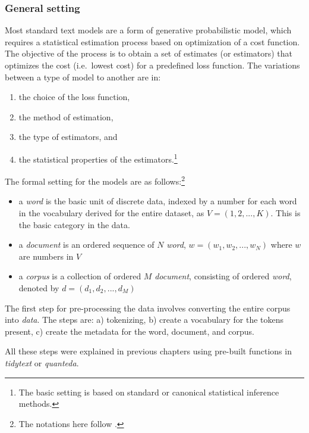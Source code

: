 \documentclass[
]{article}
\providecommand{\tightlist}{%
  \setlength{\itemsep}{0pt}\setlength{\parskip}{0pt}}
\begin{document}
\hypertarget{general-setting}{%
\subsubsection{General setting}\label{general-setting}}

Most standard text models are a form of generative probabilistic model, which requires a statistical estimation process based on optimization of a cost function. The objective of the process is to obtain a set of estimates (or estimators) that optimizes the cost (i.e.~lowest cost) for a predefined loss function. The variations between a type of model to another are in:

\begin{enumerate}
\def\labelenumi{\alph{enumi})}
\tightlist
\item
  the choice of the loss function,
\item
  the method of estimation,
\item
  the type of estimators, and
\item
  the statistical properties of the estimators.\footnote{The basic setting is based on standard or canonical statistical inference methods.}
\end{enumerate}

The formal setting for the models are as follows:\footnote{The notations here follow \citep{blei2003}.}

\begin{itemize}
\tightlist
\item
  a \emph{word} is the basic unit of discrete data, indexed by a number for each word in the vocabulary derived for the entire dataset, as \(V = ({1,2,...,K})\). This is the basic category in the data.
\item
  a \emph{document} is an ordered sequence of \(N\) \emph{word}, \(w = ({w_1,w_2,...,w_N})\) where \(w\) are numbers in \(V\)
\item
  a \emph{corpus} is a collection of ordered \(M\) \emph{document}, consisting of ordered \emph{word}, denoted by \(d = ({d_1,d_2,...,d_M})\)
\end{itemize}

The first step for pre-processing the data involves converting the entire corpus into \emph{data}. The steps are:
a) tokenizing,
b) create a vocabulary for the tokens present,
c) create the metadata for the word, document, and corpus.

All these steps were explained in previous chapters using pre-built functions in \emph{tidytext} or \emph{quanteda}.
\end{document}
